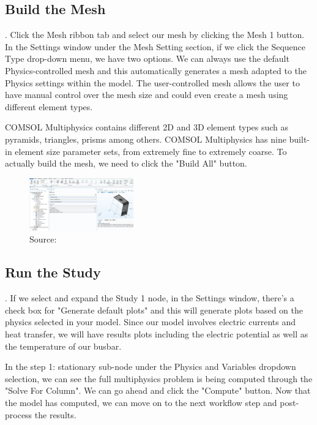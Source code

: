 \subsection{Build the Mesh}.
Click the Mesh ribbon tab and select our mesh by clicking the Mesh 1 button. In the Settings window under the Mesh Setting section, if we click the Sequence Type drop-down menu, we have two options. We can always use the default Physics-controlled mesh and this automatically generates a mesh adapted to the Physics settings within the model. The user-controlled mesh allows the user to have manual control over the mesh size and could even create a mesh using different element types.

COMSOL Multiphysics contains different 2D and 3D element types such as pyramids, triangles, prisms among others. COMSOL Multiphysics has nine built-in element size parameter sets, from extremely fine to extremely coarse. To actually build the mesh, we need to click the "Build All" button.

\begin{figure}[ht!]
  \centering
  \includegraphics[width=0.4\textwidth]{Chapters/Figures/Chapter 3 Figures/Fine Mesh.png}
  \caption{Source: \cite{}}
  \label{}
\end{figure}

\subsection{Run the Study}.
If we select and expand the Study 1 node, in the Settings window, there's a check box for "Generate default plots" and this will generate plots based on the physics selected in your model. Since our model involves electric currents and heat transfer, we will have results plots including the electric potential as well as the temperature of our busbar.

In the step 1: stationary sub-node under the Physics and Variables dropdown selection, we can see the full multiphysics problem is being computed through the "Solve For Column". We can go ahead and click the "Compute" button. Now that the model has computed, we can move on to the next workflow step and post-process the results.

